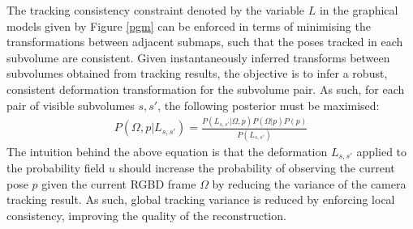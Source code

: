The tracking consistency constraint denoted by the variable $L$ in the graphical models given by Figure \ref{pgm} can 
be enforced in terms of minimising the transformations between adjacent submaps, such that the poses tracked in each subvolume are consistent.  
Given instantaneously inferred transforms between subvolumes obtained from tracking results, 
the objective is to infer a robust, consistent deformation transformation for the subvolume pair.
As such, for each pair of visible subvolumes $s, s'$, the following posterior must be maximised:
\begin{equation}
\begin{split}
P(\Omega, p | L_{s, s'}) = \frac{P(L_{s, s'} | \Omega, p) P(\Omega | p)P(p)}
{P(L_{s, s'})}
\end{split}
\end{equation}
The intuition behind the above equation is that the deformation $L_{s, s'}$ applied to the probability field $u$ should 
increase the probability of observing the current pose $p$ given the current RGBD frame $\Omega$ by reducing the 
variance of the camera tracking result. As such, global tracking variance is reduced by enforcing local consistency, improving the quality 
of the reconstruction.

